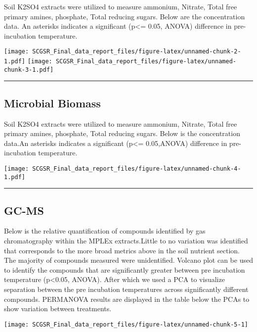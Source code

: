 \documentclass[
]{article}
\begin{document}
Soil K2SO4 extracts were utilized to measure ammonium, Nitrate, Total
free primary amines, phosphate, Total reducing sugars. Below are the
concentration data. An asterisks indicates a significant (p\textless=
0.05, ANOVA) difference in pre-incubation temperature.

\texttt{[image: SCGSR\_Final\_data\_report\_files/figure-latex/unnamed-chunk-2-1.pdf]}
\texttt{[image: SCGSR\_Final\_data\_report\_files/figure-latex/unnamed-chunk-3-1.pdf]}

\begin{center}\rule{0.5\linewidth}{0.5pt}\end{center}

\hypertarget{microbial-biomass}{%
\subsection{Microbial Biomass}\label{microbial-biomass}}

Soil K2SO4 extracts were utilized to measure ammonium, Nitrate, Total
free primary amines, phosphate, Total reducing sugars. Below is the
concentration data.An asterisks indicates a significant (p\textless=
0.05,ANOVA) difference in pre-incubation temperature.

\texttt{[image: SCGSR\_Final\_data\_report\_files/figure-latex/unnamed-chunk-4-1.pdf]}

\begin{center}\rule{0.5\linewidth}{0.5pt}\end{center}

\hypertarget{gc-ms}{%
\subsection{GC-MS}\label{gc-ms}}

Below is the relative quantification of compounds identified by gas
chromatography within the MPLEx extracts.Little to no variation was
identified that corresponds to the more broad metrics above in the soil
nutrient section. The majority of compounds measured were unidentified.
Volcano plot can be used to identify the compounds that are
significantly greater between pre incubation temperature
(p\textless0.05, ANOVA). After which we used a PCA to visualize
separation between the pre incubation temperatures across significantly
different compounds. PERMANOVA results are displayed in the table below
the PCAs to show variation between treatments.

\texttt{[image: SCGSR\_Final\_data\_report\_files/figure-latex/unnamed-chunk-5-1]}
\end{document}
